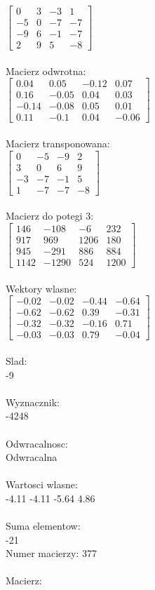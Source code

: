\documentclass[a4paper,12pt]{article}
\begin{document}
$\begin{bmatrix} 0&3&-3&1\\-5&0&-7&-7\\-9&6&-1&-7\\2&9&5&-8 \end{bmatrix}$
\\
\\
Macierz odwrotna:\\

$\begin{bmatrix} 0.04&0.05&-0.12&0.07\\0.16&-0.05&0.04&0.03\\-0.14&-0.08&0.05&0.01\\0.11&-0.1&0.04&-0.06 \end{bmatrix}$
\\
\\
Macierz transponowana:\\

$\begin{bmatrix} 0&-5&-9&2\\3&0&6&9\\-3&-7&-1&5\\1&-7&-7&-8 \end{bmatrix}$
\\
\\
Macierz do potegi 3:\\

$\begin{bmatrix} 146&-108&-6&232\\917&969&1206&180\\945&-291&886&884\\1142&-1290&524&1200 \end{bmatrix}$
\\
\\
Wektory wlasne:\\

$\begin{bmatrix} -0.02&-0.02&-0.44&-0.64\\-0.62&-0.62&0.39&-0.31\\-0.32&-0.32&-0.16&0.71\\-0.03&-0.03&0.79&-0.04 \end{bmatrix}$
\\
\\
Slad:\\
-9
\\
\\
Wyznacznik:\\
-4248
\\
\\
Odwracalnosc:\\
Odwracalna
\\
\\
Wartosci wlasne:\\
-4.11 -4.11 -5.64 4.86
\\
\\
Suma elementow:\\
-21
\\
\newpage
Numer macierzy:
377
\\
\\
Macierz:\\
\end{document}
